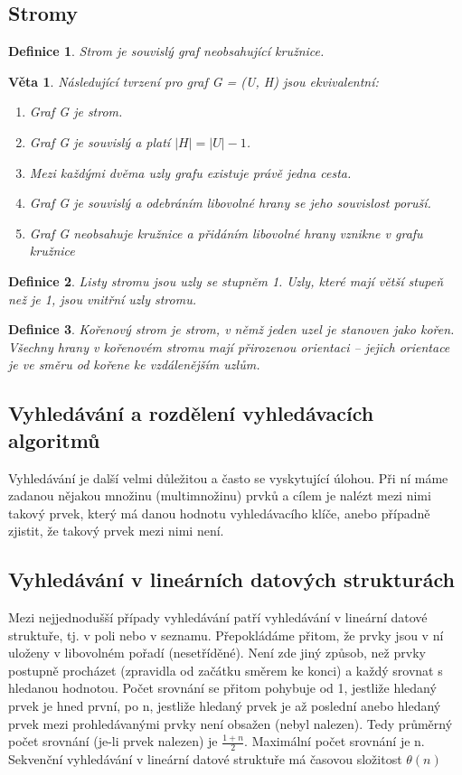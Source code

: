 \documentclass[10pt,a4paper]{article}
\newtheorem{veta}{Věta}
\newtheorem{definition}{Definice}
\begin{document}
\subsection{Stromy}
\begin{definition}
Strom je souvislý graf neobsahující kružnice.
\end{definition}
\begin{veta}
Následující tvrzení pro graf G = (U, H) jsou ekvivalentní:
\begin{enumerate}
	\item Graf G je strom.
	\item Graf G je souvislý a platí $|H| = |U|-1$.
	\item Mezi každými dvěma uzly grafu existuje právě jedna cesta.
	\item Graf G je souvislý a odebráním libovolné hrany se jeho souvislost poruší.
	\item Graf G neobsahuje kružnice a přidáním libovolné hrany vznikne v grafu kružnice
\end{enumerate}
\end{veta}
\begin{definition}
Listy stromu jsou uzly se stupněm 1. Uzly, které mají větší stupeň než je 1, jsou vnitřní uzly stromu.
\end{definition}
\begin{definition}
Kořenový strom je strom, v němž jeden uzel je stanoven jako kořen. Všechny hrany v kořenovém stromu mají přirozenou orientaci – jejich orientace je ve směru od kořene ke vzdálenějším uzlům.
\end{definition}




\subsection{Vyhledávání a rozdělení vyhledávacích algoritmů}
Vyhledávání je další velmi důležitou a často se vyskytující úlohou. Při ní máme zadanou nějakou množinu (multimnožinu) prvků a cílem je nalézt mezi nimi takový prvek, který má danou hodnotu vyhledávacího klíče, anebo případně zjistit, že takový prvek mezi nimi není.




\subsection{Vyhledávání v lineárních datových strukturách}
Mezi nejjednodušší případy vyhledávání patří vyhledávání v lineární datové struktuře, tj. v poli nebo v seznamu. Přepokládáme přitom, že prvky jsou v ní uloženy v libovolném pořadí (nesetříděné). Není zde jiný způsob, než prvky postupně procházet (zpravidla od začátku směrem ke konci) a každý srovnat s hledanou hodnotou. Počet srovnání se přitom pohybuje od 1, jestliže hledaný prvek je hned první, po n, jestliže hledaný prvek je až poslední anebo hledaný prvek mezi prohledávanými prvky není obsažen (nebyl nalezen). Tedy průměrný počet srovnání (je-li prvek nalezen) je $\frac{1+n}{2}$. Maximální počet srovnání je n. \\
Sekvenční vyhledávání v lineární datové struktuře má časovou složitost $\theta (n)$
\end{document}
